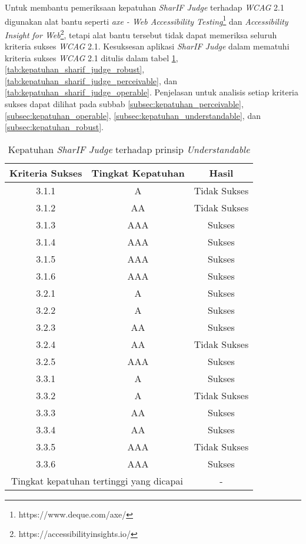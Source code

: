 Untuk membantu pemeriksaan kepatuhan \textit{SharIF Judge} terhadap \textit{WCAG} 2.1 digunakan alat bantu seperti \textit{axe - Web Accessibility Testing}\footnote{https://www.deque.com/axe/} dan \textit{Accessibility Insight for Web}\footnote{https://accessibilityinsights.io/}, tetapi alat bantu tersebut tidak dapat memeriksa seluruh kriteria sukses \textit{WCAG} 2.1. Kesuksesan aplikasi \textit{SharIF Judge} dalam mematuhi kriteria sukses \textit{WCAG} 2.1 ditulis dalam tabel \ref{tab:kepatuhan_sharif_judge_understandable}, \ref{tab:kepatuhan_sharif_judge_robust}, \ref{tab:kepatuhan_sharif_judge_perceivable}, dan \ref{tab:kepatuhan_sharif_judge_operable}. Penjelasan untuk analisis setiap kriteria sukses dapat dilihat pada subbab \ref{subsec:kepatuhan_perceivable}, \ref{subsec:kepatuhan_operable}, \ref{subsec:kepatuhan_understandable}, dan \ref{subsec:kepatuhan_robust}.

\begin{table}[H]
	\centering
	\caption{Kepatuhan \textit{SharIF Judge} terhadap prinsip \textit{Understandable}}
	\label{tab:kepatuhan_sharif_judge_understandable}
	\begin{tabular}{|c|c|c|}
		\hline
		Kriteria Sukses & Tingkat Kepatuhan & Hasil\\
		\hline
		\rowcolor{Pink} 3.1.1 & A & Tidak Sukses\\
		\rowcolor{LightRed} 3.1.2 & AA & Tidak Sukses\\
		3.1.3 & AAA& Sukses\\
		3.1.4 & AAA & Sukses\\
		3.1.5 & AAA & Sukses\\
		3.1.6 & AAA & Sukses\\
		3.2.1 & A & Sukses\\
		3.2.2 & A & Sukses\\
		3.2.3 & AA & Sukses\\
		\rowcolor{LightRed} 3.2.4 & AA & Tidak Sukses\\
		3.2.5 & AAA & Sukses\\
		3.3.1 & A & Sukses\\
		\rowcolor{Pink} 3.3.2 & A & Tidak Sukses\\
		3.3.3 & AA & Sukses\\
		3.3.4 & AA & Sukses\\
		\rowcolor{Red} 3.3.5 & AAA & Tidak Sukses\\
		3.3.6 & AAA & Sukses\\
		\hline
		\multicolumn{2}{|c|}{Tingkat kepatuhan tertinggi yang dicapai} & - \\
		\hline
	\end{tabular}
\end{table}

